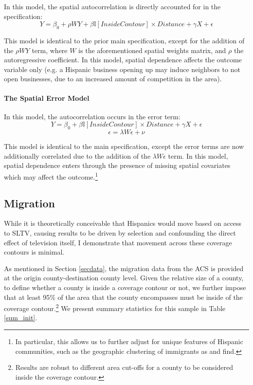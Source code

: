 \documentclass[11pt]{article}
\begin{document}
In this model, the spatial autocorrelation is directly accounted for in the specification:
\[ Y = \beta_0 + \rho W Y + \beta \mathbb{I}[InsideContour] \times Distance + \gamma X + \epsilon \]

This model is identical to the prior main specification, except for the addition of the $\rho W Y$ term, where $W$ is the aforementioned spatial weights matrix, and $\rho$ the autoregressive coefficient. In this model, spatial dependence affects the outcome variable only (e.g. a Hispanic business opening up may induce neighbors to not open businesses, due to an increased amount of competition in the area).

\paragraph{The Spatial Error Model}

In this model, the autocorrelation occurs in the error term:
\[ Y = \beta_0 + \beta \mathbb{I}[InsideContour] \times Distance + \gamma X + \epsilon \]
\[\epsilon = \lambda W \epsilon + \nu\]

This model is identical to the main specification, except the error terms are now additionally correlated due to the addition of the $\lambda W \epsilon$ term. In this model, spatial dependence enters through  the presence of missing spatial covariates which may affect the outcome.\footnote{ In particular, this allows us to further adjust for unique features of Hispanic communities, such as the geographic clustering of immigrants as \cite{cutler_when_2008} and \cite{cascio_cracks_2012} find.}

\subsection{Migration}

While it is theoretically conceivable that Hispanics would move based on access to SLTV, causing results to be driven by selection and confounding the direct effect of television itself, I demonstrate that movement across these coverage contours is minimal.

As mentioned in Section \ref{secdata}, the migration data from the ACS is provided at the origin county-destination county level. Given the relative size of a county, to define whether a county is inside a coverage contour or not, we further impose that at least 95\% of the area that the county encompasses must be inside of the coverage contour.\footnote{ Results are robust to different area cut-offs for a county to be considered inside the coverage contour.} We present summary statistics for this sample in Table \ref{sum_init}.
\end{document}
